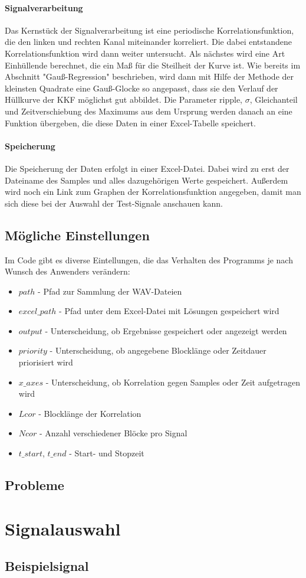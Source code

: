 \documentclass[a4paper,11pt]{article}
\begin{document}
\paragraph{Signalverarbeitung}
Das Kernstück der Signalverarbeitung ist eine periodische Korrelationsfunktion, die den linken und rechten Kanal miteinander korreliert. Die dabei entstandene Korrelationsfunktion wird dann weiter untersucht. Als nächstes wird eine Art Einhüllende berechnet, die ein Maß für die Steilheit der Kurve ist. Wie bereits im Abschnitt "Gauß-Regression" beschrieben, wird dann mit Hilfe der Methode der kleinsten Quadrate eine Gauß-Glocke so angepasst, dass sie den Verlauf der Hüllkurve der KKF möglichst gut abbildet. Die Parameter ripple, $\sigma$, Gleichanteil und Zeitverschiebung des Maximums aus dem Ursprung werden danach an eine Funktion übergeben, die diese Daten in einer Excel-Tabelle speichert.
\paragraph{Speicherung}
Die Speicherung der Daten erfolgt in einer Excel-Datei. Dabei wird zu erst der Dateiname des Samples und alles dazugehörigen Werte gespeichert. Außerdem wird noch ein Link zum Graphen der Korrelationsfunktion angegeben, damit man sich diese bei der Auswahl der Test-Signale anschauen kann.
\subsection{Mögliche Einstellungen}
Im Code gibt es diverse Eintellungen, die das Verhalten des Programms je nach Wunsch des Anwenders verändern:
\begin{itemize} 
\item $path$ - Pfad zur Sammlung der WAV-Dateien
\item $excel\_path$ - Pfad unter dem Excel-Datei mit Lösungen gespeichert wird
\item $output$ - Unterscheidung, ob Ergebnisse gespeichert oder angezeigt werden
\item $priority$ - Unterscheidung, ob angegebene Blocklänge oder Zeitdauer priorisiert wird
\item $x\_axes$ - Unterscheidung, ob Korrelation gegen Samples oder Zeit aufgetragen wird
\item $Lcor$ - Blocklänge der Korrelation
\item $Ncor$ - Anzahl verschiedener Blöcke pro Signal
\item $t\_start$, $t\_end$ - Start- und Stopzeit
\end{itemize}
\subsection{Probleme} 


\section{Signalauswahl}
\subsection{Beispielsignal}

\begin{appendix}

\end{appendix}
\end{document}
